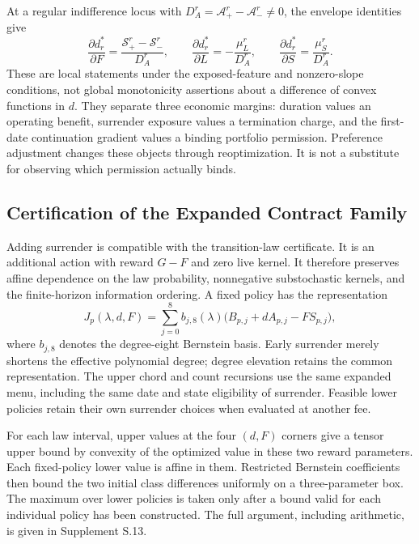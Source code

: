 At a regular indifference locus with $D_A^r=\mathcal A^r_+-\mathcal A^r_-\neq0$, the envelope identities give
\begin{equation}
 \frac{\partial d_r^*}{\partial F}=\frac{\mathcal S^r_+-\mathcal S^r_-}{D_A^r},\qquad
 \frac{\partial d_r^*}{\partial L}=-\frac{\mu_L^r}{D_A^r},\qquad
 \frac{\partial d_r^*}{\partial S}=\frac{\mu_S^r}{D_A^r}.
 \label{eq:r9_frontier_derivatives}
\end{equation}
These are local statements under the exposed-feature and nonzero-slope conditions, not global monotonicity assertions about a difference of convex functions in $d$. They separate three economic margins: duration values an operating benefit, surrender exposure values a termination charge, and the first-date continuation gradient values a binding portfolio permission. Preference adjustment changes these objects through reoptimization. It is not a substitute for observing which permission actually binds.

\subsection{Certification of the Expanded Contract Family}
\label{subsec:r9_certificate}
Adding surrender is compatible with the transition-law certificate. It is an additional action with reward $G-F$ and zero live kernel. It therefore preserves affine dependence on the law probability, nonnegative substochastic kernels, and the finite-horizon information ordering. A fixed policy has the representation
\begin{equation}
 J_p(\lambda,d,F)=\sum_{j=0}^{8} b_{j,8}(\lambda)
       \bigl(B_{p,j}+d A_{p,j}-F S_{p,j}\bigr),
 \label{eq:r9_tensor_policy}
\end{equation}
where $b_{j,8}$ denotes the degree-eight Bernstein basis. Early surrender merely shortens the effective polynomial degree; degree elevation retains the common representation. The upper chord and count recursions use the same expanded menu, including the same date and state eligibility of surrender. Feasible lower policies retain their own surrender choices when evaluated at another fee.

For each law interval, upper values at the four $(d,F)$ corners give a tensor upper bound by convexity of the optimized value in these two reward parameters. Each fixed-policy lower value is affine in them. Restricted Bernstein coefficients then bound the two initial class differences uniformly on a three-parameter box. The maximum over lower policies is taken only after a bound valid for each individual policy has been constructed. The full argument, including arithmetic, is given in Supplement S.13.

